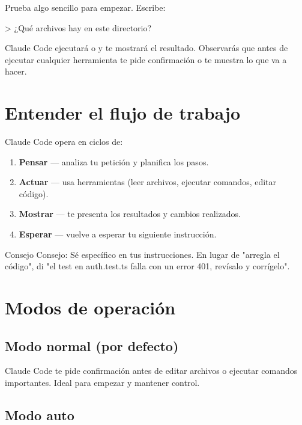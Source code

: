 \documentclass[11pt,a4paper]{report}
\DeclareRobustCommand{\texttt}[1]{{\ttfamily\seqsplit{#1}}}
\begin{document}
Prueba algo sencillo para empezar. Escribe:

\begin{codebox}
> ¿Qué archivos hay en este directorio?
\end{codebox}

Claude Code ejecutará \texttt{ls} o \texttt{find} y te mostrará el resultado. Observarás que antes de ejecutar cualquier herramienta te pide confirmación o te muestra lo que va a hacer.

\section{Entender el flujo de trabajo}

Claude Code opera en ciclos de:

\begin{enumerate}
\item \textbf{Pensar} — analiza tu petición y planifica los pasos.
\item \textbf{Actuar} — usa herramientas (leer archivos, ejecutar comandos, editar código).
\item \textbf{Mostrar} — te presenta los resultados y cambios realizados.
\item \textbf{Esperar} — vuelve a esperar tu siguiente instrucción.
\end{enumerate}

\begin{calloutbox}{Consejo}
Consejo: Sé específico en tus instrucciones. En lugar de "arregla el código", di "el test en auth.test.ts falla con un error 401, revísalo y corrígelo".\end{calloutbox}

\section{Modos de operación}

\subsection{Modo normal (por defecto)}

Claude Code te pide confirmación antes de editar archivos o ejecutar comandos importantes. Ideal para empezar y mantener control.

\subsection{Modo auto}
\end{document}
